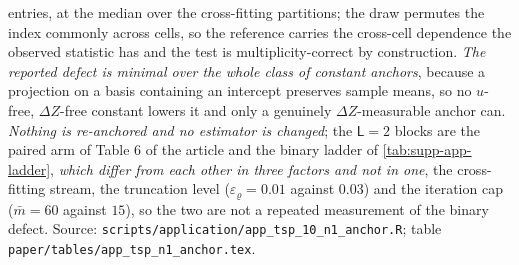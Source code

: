 \documentclass[
  12pt]{article}
\newcommand{\1}[1]{\mathds{1}\left[#1\right]}
\theoremstyle{plain}
\theoremstyle{definition}
\theoremstyle{definition}
\theoremstyle{remark}
\begin{document}
\begin{table}[!htbp]
\begin{threeparttable}
\begin{tablenotes}
entries, at the median over the cross-fitting partitions; the draw permutes the
index commonly across cells, so the reference carries the cross-cell dependence
the observed statistic has and the test is multiplicity-correct by construction.
\emph{The reported
defect is minimal over the whole class of constant anchors}, because a projection
on a basis containing an intercept preserves sample means, so no $u$-free,
$\Delta Z$-free constant lowers it and only a genuinely $\Delta Z$-measurable
anchor can. \emph{Nothing is re-anchored and no estimator is changed}; the
$\mathsf L=2$ blocks are the paired arm of Table 6 of the article and the binary
ladder of \cref{tab:supp-app-ladder}, \emph{which differ from each other in
three factors and not in one}, the cross-fitting stream, the truncation level
($\varepsilon_\varrho=0.01$ against $0.03$) and the iteration cap ($\bar m=60$
against $15$), so the two are not a repeated measurement of the binary defect.
Source:
\texttt{scripts/application/app\_tsp\_10\_n1\_anchor.R}; table
\texttt{paper/tables/app\_tsp\_n1\_anchor.tex}.
\end{tablenotes}
\end{threeparttable}
\end{table}
%
%
\end{document}
